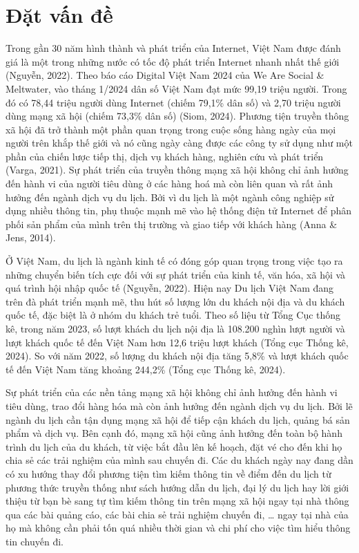 \fontsize{13}{15}\selectfont
\section{Đặt vấn đề}

Trong gần 30 năm hình thành và phát triển của Internet, Việt Nam được đánh giá là một trong những nước có tốc độ phát triển Internet nhanh nhất thế giới (Nguyễn, 2022). Theo báo cáo Digital Việt Nam 2024 của We Are Social \& Meltwater, vào tháng 1/2024 dân số Việt Nam đạt mức 99,19 triệu người. Trong đó có 78,44 triệu người dùng Internet (chiếm 79,1\% dân số) và 2,70 triệu người dùng mạng xã hội (chiếm 73,3\% dân số) (Siom, 2024). Phương tiện truyền thông xã hội đã trở thành một phần quan trọng trong cuộc sống hàng ngày của mọi người trên khắp thế giới và nó cũng ngày càng được các công ty sử dụng như một phần của chiến lược tiếp thị, dịch vụ khách hàng, nghiên cứu và phát triển (Varga, 2021). Sự phát triển của truyền thông mạng xã hội không chỉ ảnh hưởng đến hành vi của người tiêu dùng ở các hàng hoá mà còn liên quan và rất ảnh hưởng đến ngành dịch vụ du lịch. Bởi vì du lịch là một ngành công nghiệp sử dụng nhiều thông tin, phụ thuộc mạnh mẽ vào hệ thống điện tử Internet để phân phối sản phẩm của mình trên thị trường và giao tiếp với khách hàng (Anna \& Jens, 2014).

Ở Việt Nam, du lịch là ngành kinh tế có đóng góp quan trọng trong việc tạo ra những chuyển biến tích cực đối với sự phát triển của kinh tế, văn hóa, xã hội và quá trình hội nhập quốc tế (Nguyễn, 2022). Hiện nay Du lịch Việt Nam đang trên đà phát triển mạnh mẽ, thu hút số lượng lớn du khách nội địa và du khách quốc tế, đặc biệt là ở nhóm du khách trẻ tuổi. Theo số liệu từ Tổng Cục thống kê, trong năm 2023, số lượt khách du lịch nội địa là 108.200 nghìn lượt người và lượt khách quốc tế đến Việt Nam hơn 12,6 triệu lượt khách (Tổng cục Thống kê, 2024). So với năm 2022, số lượng du khách nội địa tăng 5,8\% và lượt khách quốc tế đến Việt Nam tăng khoảng 244,2\% (Tổng cục Thống kê, 2024).

Sự phát triển của các nền tảng mạng xã hội không chỉ ảnh hưởng đến hành vi tiêu dùng, trao đổi hàng hóa mà còn ảnh hưởng đến ngành dịch vụ du lịch. Bởi lẽ ngành du lịch cần tận dụng mạng xã hội để tiếp cận khách du lịch, quảng bá sản phẩm và dịch vụ. Bên cạnh đó, mạng xã hội cũng ảnh hưởng đến toàn bộ hành trình du lịch của du khách, từ việc bắt đầu lên kế hoạch, đặt vé cho đến khi họ chia sẻ các trải nghiệm của mình sau chuyến đi. Các du khách ngày nay đang dần có xu hướng thay đổi phương tiện tìm kiếm thông tin về điểm đến du lịch từ phương thức truyền thống như sách hướng dẫn du lịch, đại lý du lịch hay lời giới thiệu từ bạn bè sang tự tìm kiếm thông tin trên mạng xã hội ngay tại nhà thông qua các bài quảng cáo, các bài chia sẻ trải nghiệm chuyến đi, … ngay tại nhà của họ mà không cần phải tốn quá nhiều thời gian và chi phí cho việc tìm hiểu thông tin chuyến đi.

